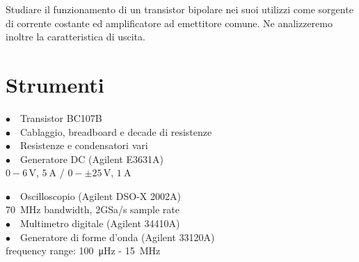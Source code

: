 Studiare il funzionamento di un transistor bipolare nei suoi utilizzi come sorgente di corrente costante ed amplificatore ad emettitore comune. Ne analizzeremo inoltre la caratteristica di uscita.

\section{Strumenti}
%
\noindent
\begin{minipage}{.5\linewidth}
$\bullet \quad$Transistor BC107B\\
$\bullet \quad$Cablaggio, breadboard e decade di resistenze\\
$\bullet \quad$Resistenze e condensatori vari\\
$\bullet \quad$Generatore DC (Agilent E3631A)\\
\phantom{xxxx}$0-6\,\si{\volt}$, $\SI{5}{\ampere}$ / $0-\pm25\,\si{\volt}$, $\SI{1}{\ampere}$\\
\end{minipage}%
\begin{minipage}{.5\linewidth}
$\bullet \quad$Oscilloscopio (Agilent DSO-X 2002A)\\
\phantom{xxxx}\SI{70}{\mega\hertz} bandwidth, 2GSa/s sample rate\\
$\bullet \quad$Multimetro digitale (Agilent 34410A)\\
$\bullet \quad$Generatore di forme d'onda (Agilent 33120A)\\
\phantom{xxxx}frequency range: \SI{100}{\micro\hertz} - \SI{15}{\mega\hertz}\\
\end{minipage}